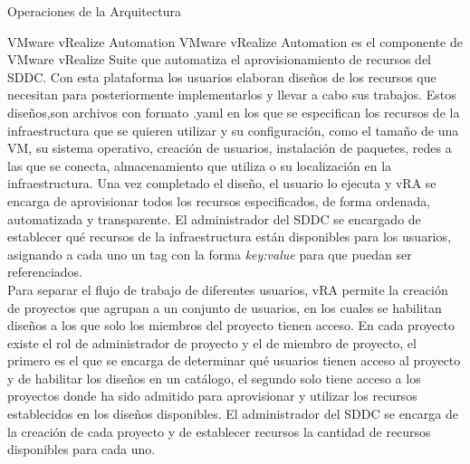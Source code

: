 \begin{subsection}{Operaciones de la Arquitectura}
    \begin{subsubsection}{VMware vRealize Automation}
        VMware vRealize Automation es el componente de VMware vRealize Suite que automatiza el aprovisionamiento de recursos del SDDC. Con esta plataforma los usuarios elaboran diseños de los recursos que necesitan para posteriormente implementarlos y llevar a cabo sus trabajos. Estos diseños,son archivos con formato .yaml en los que se especifican los recursos de la infraestructura que se quieren utilizar y su configuración, como el tamaño de una VM, su sistema operativo, creación de usuarios, instalación de paquetes, redes a las que se conecta, almacenamiento que utiliza o su localización en la infraestructura. Una vez completado el diseño, el usuario lo ejecuta y vRA se encarga de aprovisionar todos los recursos especificados, de forma ordenada, automatizada y transparente. El administrador del SDDC se encargado de establecer qué recursos de la infraestructura están disponibles para los usuarios, asignando a cada uno un tag con la forma \textit{key:value} para que puedan ser referenciados.
        \\        
        Para separar el flujo de trabajo de diferentes usuarios, vRA permite la creación de proyectos que agrupan a un conjunto de usuarios, en los cuales se habilitan diseños a los que solo los miembros del proyecto tienen acceso. En cada proyecto existe el rol de administrador de proyecto y el de miembro de proyecto, el primero es el que se encarga de determinar qué usuarios tienen acceso al proyecto y de habilitar los diseños en un catálogo, el segundo solo tiene acceso a los proyectos donde ha sido admitido para aprovisionar y utilizar los recursos establecidos en los diseños disponibles. El administrador del SDDC se encarga de la creación de cada proyecto y de establecer recursos la cantidad de recursos disponibles para cada uno.

\end{subsubsection}
\end{subsection}
